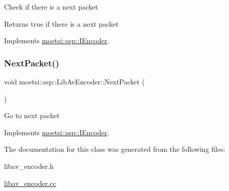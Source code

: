 Check if there is a next packet \begin{DoxyReturn}{Returns}
true if there is a next packet 
\end{DoxyReturn}


Implements \hyperlink{classmoetsi_1_1ssp_1_1IEncoder_a2af8e23d841ef61f6ee4037e56a3694d}{moetsi\+::ssp\+::\+I\+Encoder}.

\mbox{\label{classmoetsi_1_1ssp_1_1LibAvEncoder_acf5e6e2f172d24778c7942c8cd37330b}} 
\subsubsection{\texorpdfstring{Next\+Packet()}{NextPacket()}}
{\footnotesize\ttfamily void moetsi\+::ssp\+::\+Lib\+Av\+Encoder\+::\+Next\+Packet (\begin{DoxyParamCaption}{ }\end{DoxyParamCaption})\hspace{0.3cm}{\ttfamily [virtual]}}

Go to next packet 

Implements \hyperlink{classmoetsi_1_1ssp_1_1IEncoder_afac3ddcf2f49be16020c83cb9e0fb274}{moetsi\+::ssp\+::\+I\+Encoder}.



The documentation for this class was generated from the following files\+:\begin{DoxyCompactItemize}
\item 
libav\+\_\+encoder.\+h\item 
\hyperlink{libav__encoder_8cc}{libav\+\_\+encoder.\+cc}\end{DoxyCompactItemize}
